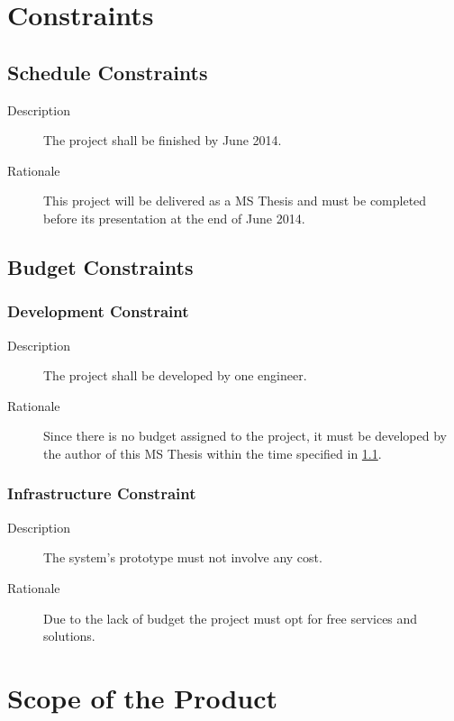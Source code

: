 \section{Constraints} \label{constraints}
\subsection{Schedule Constraints} \label{schedule_constraint}

\begin{description}
\item[Description] The project shall be finished by June 2014.
\item[Rationale] This project will be delivered as a MS Thesis and must be completed before its presentation at the end of June 2014.
\end{description}

\subsection{Budget Constraints}

\subsubsection{Development Constraint}

\begin{description}
\item[Description] The project shall be developed by one engineer.
\item[Rationale] Since there is no budget assigned to the project, it must be developed by the author of this MS Thesis within the time specified in \ref{schedule_constraint}.
\end{description}

\subsubsection{Infrastructure Constraint}

\begin{description}
\item[Description] The system's prototype must not involve any cost.
\item[Rationale] Due to the lack of budget the project must opt for free services and solutions.
\end{description}

\section{Scope of the Product}

